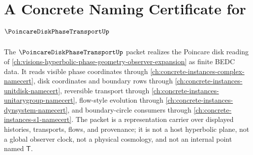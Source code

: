 \chapter{A Concrete Naming Certificate for $\PoincareDiskPhaseTransportUp$}
\label{ch:concrete-instances-poincare-disk-phase-transport-namecert}

The $\PoincareDiskPhaseTransportUp$ packet realizes the Poincare disk reading of \autoref{ch:visions-hyperbolic-phase-geometry-observer-expansion} as finite BEDC data. It reads visible phase coordinates through \autoref{ch:concrete-instances-complex-namecert}, disk coordinates and boundary rows through \autoref{ch:concrete-instances-unitdisk-namecert}, reversible transport through \autoref{ch:concrete-instances-unitarygroup-namecert}, flow-style evolution through \autoref{ch:concrete-instances-dynsystem-namecert}, and boundary-circle consumers through \autoref{ch:concrete-instances-s1-namecert}. The packet is a representation carrier over displayed histories, transports, flows, and provenance; it is not a host hyperbolic plane, not a global observer clock, not a physical cosmology, and not an internal point named $\mathsf{T}$.


